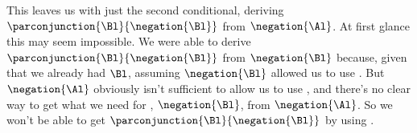 \begin{gproof}
\end{gproof}
This leaves us with just the second conditional, deriving $\parconjunction{\Bl}{\negation{\Bl}}$ from $\negation{\Al}$. At first glance this may seem impossible. 
We were able to derive $\parconjunction{\Bl}{\negation{\Bl}}$ from $\negation{\Bl}$ because, given that we already had $\Bl$, assuming $\negation{\Bl}$ allowed us to use . 
But $\negation{\Al}$ obviously isn't sufficient to allow us to use , and there's no clear way to get what we need for , $\negation{\Bl}$, from $\negation{\Al}$. 
So we won't be able to get $\parconjunction{\Bl}{\negation{\Bl}}$ by using . 

